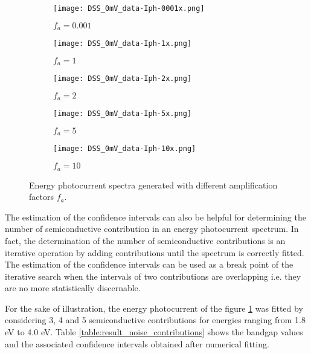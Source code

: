\renewcommand{\coef}{0.3}
\begin{figure*}[htp]
	\centering
	\begin{subfigure}{\coef\textwidth}
		\centering
	 	\texttt{[image: DSS\_0mV\_data-Iph-0001x.png]}
	 	\caption{$f_a=0.001$}
	 	\label{fig:fa0001}
	\end{subfigure}
	\begin{subfigure}{\coef\textwidth}
		\centering
	 	\texttt{[image: DSS\_0mV\_data-Iph-1x.png]}
	 	\caption{$f_a=1$}
	 	\label{fig:fa1}
	\end{subfigure}
	\begin{subfigure}{\coef\textwidth}
		\centering
	 	\texttt{[image: DSS\_0mV\_data-Iph-2x.png]}
	 	\caption{$f_a=2$}
	 	\label{fig:fa2}
	\end{subfigure}
	
	\begin{subfigure}{\coef\textwidth}
		\centering
	 	\texttt{[image: DSS\_0mV\_data-Iph-5x.png]}
	 	\caption{$f_a=5$}
	 	\label{fig:fa5}
	\end{subfigure}\quad
	\begin{subfigure}{\coef\textwidth}
		\centering
	 	\texttt{[image: DSS\_0mV\_data-Iph-10x.png]}
	 	\caption{$f_a=10$}
	 	\label{fig:fa10}
	\end{subfigure}
	\caption{Energy photocurrent spectra generated with different amplification factors $f_a$.}
	\label{fig:data_noise}
\end{figure*}

The estimation of the confidence intervals can also be helpful for determining 
the number of semiconductive contribution in an energy photocurrent spectrum. 
In fact, the determination of the number of semiconductive contributions is an 
iterative operation by adding contributions until the spectrum is correctly fitted. 
The estimation of the confidence intervals can be used as a break point of the 
iterative search when the intervals of two contributions are overlapping i.e. 
they are no more statistically discernable. 

For the sake of illustration, the energy photocurrent of the figure \ref{fig:fa0001} 
was fitted by considering 3, 4 and 5 semiconductive contributions for energies 
ranging from 1.8 eV to 4.0 eV. Table \ref{table:result_noise_contributions} 
shows the bandgap values and the associated confidence intervals obtained 
after numerical fitting. 

